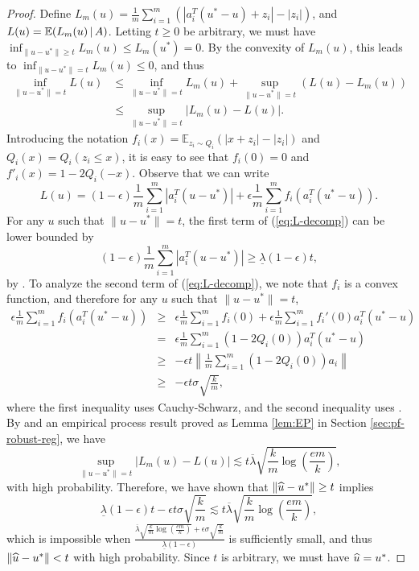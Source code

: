 \begin{proof}
Define $L_m(u)=\frac{1}{m}\sum_{i=1}^m(|a_i^T(u^*-u)+z_i|-|z_i|)$, and $L(u)=\mathbb{E}(L_m(u) \,|\, A)$.
Letting $t\geq 0$ be arbitrary, we must have $\inf_{\|u-u^*\|\geq t}L_m(u)\leq L_m(u^*)=0$. By the convexity of $L_m(u)$, this leads to $\inf_{\|u-u^*\|= t}L_m(u)\leq 0$, and thus
\begin{align*}
\inf_{\|u-u^*\|=t}L(u) &\leq \inf_{\|u-u^*\|=t}L_m(u) + \sup_{\|u-u^*\|=t} \left(L(u) - L_m(u)\right) \\
& \leq \sup_{\|u-u^*\|=t}|L_m(u)-L(u)|.
\end{align*}
Introducing the notation $f_i(x)=\mathbb{E}_{z_i\sim Q_i}(|x+z_i|-|z_i|)$ and $Q_i(x)=Q_i(z_i\leq x)$,
it is easy to see that $f_i(0)=0$ and $f'_i(x)=1-2Q_i(-x)$. Observe that we can write
\begin{equation}
L(u)=(1-\epsilon)\frac{1}{m}\sum_{i=1}^m|a_i^T(u-u^*)| + \epsilon\frac{1}{m}\sum_{i=1}^mf_i(a_i^T(u^*-u)). \label{eq:L-decomp}
\end{equation}
For any $u$ such that $\|u-u^*\|=t$, the first term of (\ref{eq:L-decomp}) can be lower bounded by
$$(1-\epsilon)\frac{1}{m}\sum_{i=1}^m|a_i^T(u-u^*)| \geq \underline{\lambda}(1-\epsilon)t,$$
by \conditionB. To analyze the second term of (\ref{eq:L-decomp}), we note that $f_i$ is a convex function, and therefore
for any $u$ such that $\|u-u^*\|=t$,
\begin{eqnarray*}
\epsilon\frac{1}{m}\sum_{i=1}^mf_i(a_i^T(u^*-u)) &\geq& \epsilon\frac{1}{m}\sum_{i=1}^mf_i(0) + \epsilon\frac{1}{m}\sum_{i=1}^mf_i'(0)a_i^T(u^*-u) \\
&=& \epsilon\frac{1}{m}\sum_{i=1}^m\left(1-2Q_i(0)\right)a_i^T(u^*-u) \\
&\geq& -\epsilon t\left\|\frac{1}{m}\sum_{i=1}^m\left(1-2Q_i(0)\right)a_i\right\| \\
&\geq& -\epsilon t\sigma\sqrt{\frac{k}{m}},
\end{eqnarray*}
where the first inequality uses Cauchy-Schwarz, and the second inequality uses \conditionA.
By \conditionB{} and an empirical process result proved as Lemma \ref{lem:EP} in Section \ref{sec:pf-robust-reg}, we have
\begin{equation}
\sup_{\|u-u^*\|= t}|L_m(u)-L(u)| \lesssim t\overline{\lambda}\sqrt{\frac{k}{m}\log\left(\frac{em}{k}\right)}, \label{eq:upper-EP}
\end{equation}
with high probability.
Therefore, we have shown that $\|\widehat{u}-u^*\|\geq t$ implies
$$\underline{\lambda}(1-\epsilon)t - \epsilon t\sigma\sqrt{\frac{k}{m}} \lesssim t\overline{\lambda}\sqrt{\frac{k}{m}\log\left(\frac{em}{k}\right)},$$
which is impossible when $\frac{\overline{\lambda}\sqrt{\frac{k}{m}\log\left(\frac{em}{k}\right)}+\epsilon\sigma\sqrt{\frac{k}{m}}}{\underline{\lambda}(1-\epsilon)}$ is sufficiently small, and thus $\|\widehat{u}-u^*\|< t$ with high probability. Since $t$ is arbitrary, we must have $\widehat{u}=u^*$.
\end{proof}

